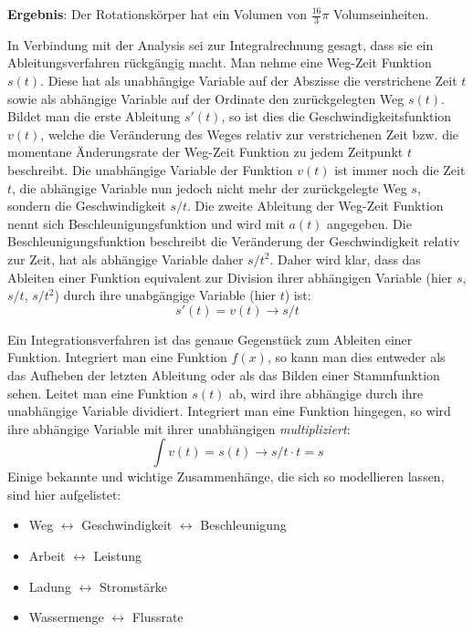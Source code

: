 \textbf{Ergebnis}: Der Rotationsk\"{o}rper hat ein Volumen von $\frac{16}{3}\pi$ Volumseinheiten.

\pagebreak


In Verbindung mit der Analysis sei zur Integralrechnung gesagt, dass sie ein Ableitungsverfahren r\"{u}ckg\"{a}ngig macht. Man nehme eine Weg-Zeit Funktion $s(t)$. Diese hat als unabh\"{a}ngige Variable auf der Abszisse die verstrichene Zeit $t$ sowie als abh\"{a}ngige Variable auf der Ordinate den zur\"{u}ckgelegten Weg $s(t)$. Bildet man die erste Ableitung $s'(t)$, so ist dies die Geschwindigkeitsfunktion $v(t)$, welche die Ver\"{a}nderung des Weges relativ zur verstrichenen Zeit bzw. die momentane \"{A}nderungsrate der Weg-Zeit Funktion zu jedem Zeitpunkt $t$ beschreibt. Die unabh\"{a}ngige Variable der Funktion $v(t)$ ist immer noch die Zeit $t$, die abh\"{a}ngige Variable nun jedoch nicht mehr der zur\"{u}ckgelegte Weg $s$, sondern die Geschwindigkeit $s/t$. Die zweite Ableitung der Weg-Zeit Funktion nennt sich Beschleunigungsfunktion und wird mit $a(t)$ angegeben. Die Beschleunigungsfunktion beschreibt die Ver\"{a}nderung der Geschwindigkeit relativ zur Zeit, hat als abh\"{a}ngige Variable daher $s/t^2$. Daher wird klar, dass das Ableiten einer Funktion equivalent zur Division ihrer abh\"{a}ngigen Variable (hier $s$, $s/t$, $s/t^2$) durch ihre unabg\"{a}ngige Variable (hier $t$) ist: $$s'(t) = v(t) \rightarrow s/t$$

Ein Integrationsverfahren ist das genaue Gegenst\"{u}ck zum Ableiten einer Funktion. Integriert man eine Funktion $f(x)$, so kann man dies entweder als das Aufheben der letzten Ableitung oder als das Bilden einer Stammfunktion sehen. Leitet man eine Funktion $s(t)$ ab, wird ihre abh\"{a}ngige durch ihre unabh\"{a}ngige Variable dividiert. Integriert man eine Funktion hingegen, so wird ihre abh\"{a}ngige Variable mit ihrer unabh\"{a}ngigen \emph{multipliziert}: $$\int v(t) = s(t) \rightarrow s/t \cdot t = s$$ Einige bekannte und wichtige Zusammenh\"{a}nge, die sich so modellieren lassen, sind hier aufgelistet:

\begin{itemize}
	\item Weg $\longleftrightarrow$ Geschwindigkeit $\longleftrightarrow$ Beschleunigung

	\item Arbeit $\longleftrightarrow$ Leistung

	\item Ladung $\longleftrightarrow$ Stromst\"{a}rke

	\item Wassermenge $\longleftrightarrow$ Flussrate
\end{itemize}

